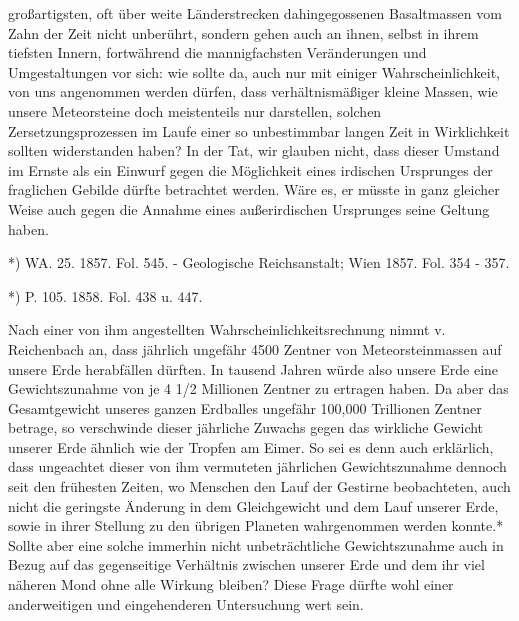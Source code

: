 \documentclass[a4paper, 8pt, oneside, polutonikogreek, german]{article}
\begin{document}
großartigsten, oft über weite Länderstrecken dahingegossenen Basaltmassen vom Zahn der Zeit nicht unberührt, sondern gehen auch an ihnen, selbst in ihrem tiefsten Innern, fortwährend die mannigfachsten Veränderungen und Umgestaltungen vor sich: wie sollte da, auch nur mit einiger Wahrscheinlichkeit, von uns angenommen werden dürfen, dass verhältnismäßiger kleine Massen, wie unsere Meteorsteine doch meistenteils nur darstellen, solchen Zersetzungsprozessen im Laufe einer so unbestimmbar langen Zeit in Wirklichkeit sollten widerstanden haben? In der Tat, wir glauben nicht, dass dieser Umstand im Ernste als ein Einwurf gegen die Möglichkeit eines irdischen Ursprunges der fraglichen Gebilde dürfte betrachtet werden. Wäre es, er müsste in ganz gleicher Weise auch gegen die Annahme eines außerirdischen Ursprunges seine Geltung haben.

*) WA. 25. 1857. Fol. 545. - Geologische Reichsanstalt; Wien 1857. Fol. 354 - 357.

*) P. 105. 1858. Fol. 438 u. 447.

Nach einer von ihm angestellten Wahrscheinlichkeitsrechnung nimmt v. Reichenbach an, dass jährlich ungefähr 4500 Zentner von Meteorsteinmassen auf unsere Erde herabfällen dürften. In tausend Jahren würde also unsere Erde eine Gewichtszunahme von je 4 1/2 Millionen Zentner zu ertragen haben. Da aber das Gesamtgewicht unseres ganzen Erdballes ungefähr 100,000 Trillionen Zentner betrage, so verschwinde dieser jährliche Zuwachs gegen das wirkliche Gewicht unserer Erde ähnlich wie der Tropfen am Eimer. So sei es denn auch erklärlich, dass ungeachtet dieser von ihm vermuteten jährlichen Gewichtszunahme dennoch seit den frühesten Zeiten, wo Menschen den Lauf der Gestirne beobachteten, auch nicht die geringste Änderung in dem Gleichgewicht und dem Lauf unserer Erde, sowie in ihrer Stellung zu den übrigen Planeten wahrgenommen werden konnte.* Sollte aber eine solche immerhin nicht unbeträchtliche Gewichtszunahme auch in Bezug auf das gegenseitige Verhältnis zwischen unserer Erde und dem ihr viel näheren Mond ohne alle Wirkung bleiben? Diese Frage dürfte wohl einer anderweitigen und eingehenderen Untersuchung wert sein.
\end{document}
